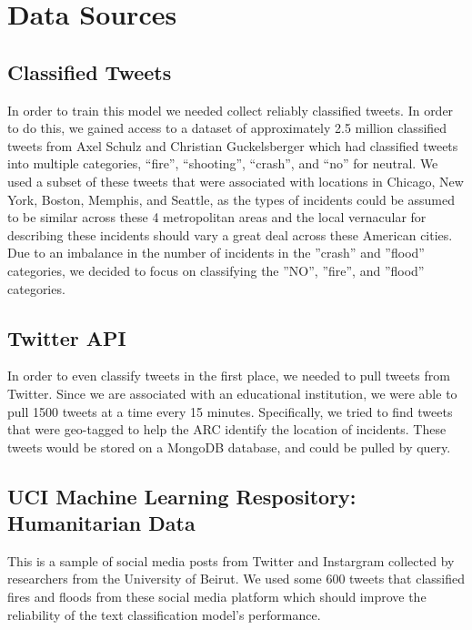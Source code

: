 \documentclass[titlepage, 12pt]{article}
\begin{document}
\section{Data Sources}

\subsection{Classified Tweets}
\hspace{0.5 cm}In order to train this model we needed collect reliably classified tweets. In order to do this, we gained access to a dataset of approximately 2.5 million classified tweets from Axel Schulz and Christian Guckelsberger which had classified  tweets into multiple categories, ``fire'', ``shooting'', ``crash'', and ``no'' for neutral. We used a subset of these tweets that were associated with locations in Chicago, New York, Boston, Memphis, and Seattle, as the types of incidents could be assumed to be similar across these 4 metropolitan areas and the local vernacular for describing these incidents should vary a great deal across these American cities. Due to an imbalance in the number of incidents in the ''crash'' and ''flood'' categories, we decided to focus on classifying the ''NO'', ''fire'', and ''flood'' categories.
\citep{CT.2015}

\subsection{Twitter API}
\hspace{0.5 cm}In order to even classify tweets in the first place, we needed to pull tweets from Twitter. Since we are associated with an educational institution, we were able to pull 1500 tweets at a time every 15 minutes. Specifically, we tried to find tweets that were geo-tagged to help the ARC identify the location of incidents. These tweets would be stored on a MongoDB database, and could be pulled by query.

\subsection{UCI Machine Learning Respository: Humanitarian Data}
\hspace{0.5 cm}This is a sample of social media posts from Twitter and Instargram collected by researchers from the University of Beirut. We used some 600 tweets that classified fires and floods from these social media platform which should improve the reliability of the text classification model's performance.
\citep{UCI.2016}
\end{document}
